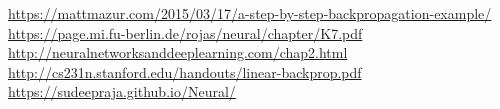 \documentclass{article}
\begin{document}
\begin{thebibliography}{9}

%
\url{https://mattmazur.com/2015/03/17/a-step-by-step-backpropagation-example/}
\\
\url{https://page.mi.fu-berlin.de/rojas/neural/chapter/K7.pdf}
\\
\url{http://neuralnetworksanddeeplearning.com/chap2.html}
\\
\url{http://cs231n.stanford.edu/handouts/linear-backprop.pdf}
\\
\url{https://sudeepraja.github.io/Neural/}
\\
\end{thebibliography}
\end{document}
